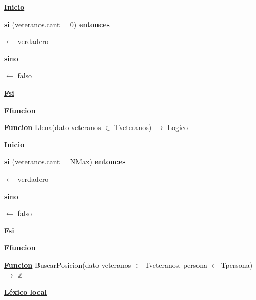 \documentclass{article}
\begin{document}
        \hspace{8mm}\underline{\textbf{Inicio}}

            \hspace{12mm}\underline{\textbf{si}} (veteranos.cant = 0) \underline{\textbf{entonces}}

                \hspace{16mm}$\leftarrow$ verdadero

            \hspace{12mm}\underline{\textbf{sino}}

                \hspace{16mm}$\leftarrow$ falso

        \hspace{12mm}\underline{\textbf{Fsi}}

    \hspace{4mm}\underline{\textbf{Ffuncion}}

    \vspace{4mm}

    \hspace{4mm}\underline{\textbf{Funcion}} Llena(dato veteranos $\in$ Tveteranos) $\rightarrow$ Logico

        \hspace{8mm}\underline{\textbf{Inicio}}

            \hspace{12mm}\underline{\textbf{si}} (veteranos.cant = NMax) \underline{\textbf{entonces}}

                \hspace{16mm}$\leftarrow$ verdadero

            \hspace{12mm}\underline{\textbf{sino}}

                \hspace{16mm}$\leftarrow$ falso

            \hspace{12mm}\underline{\textbf{Fsi}}

    \hspace{4mm}\underline{\textbf{Ffuncion}}

    \vspace{4mm}

    \hspace{4mm}\underline{\textbf{Funcion}} BuscarPosicion(dato veteranos $\in$ Tveteranos, persona $\in$ Tpersona) $\rightarrow$ $\mathbb{Z}$

        \hspace{8mm}\underline{\textbf{Léxico local}}
\end{document}

